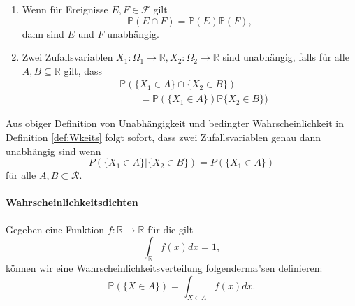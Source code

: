 \begin{Def}

\begin{enumerate}
	\item Wenn f\"ur Ereignisse $E, F \in \mathcal{F} $ gilt
	\begin{equation} 
	\mathbb{P} (E\cap F)= \mathbb{P} (E)  \mathbb{P} (F),
	\end{equation}
        dann sind $E$ und $F$ unabhängig. 
\item Zwei Zufallsvariablen $X_1 : \Omega_1 \to \mathbb{R}, X_2:\Omega_2 \to \mathbb{R}$
sind unabhängig, falls für alle $A, B \subseteq \mathbb{R}$ gilt, dass
\begin{align*}
&\mathbb{P} (\{X_{1} \in A\} \cap \{X_{2} \in B\} )\\ &\qquad= \mathbb{P} (\{X_{1} \in A\})  \mathbb{P} \{X_{2} \in B\} )
\end{align*}
\end{enumerate}

Aus obiger Definition von Unabh\"angigkeit und bedingter Wahrscheinlichkeit in Definition \ref{def:Wkeits} folgt sofort, dass zwei Zufallsvariablen  genau dann unabh\"angig sind wenn
\begin{equation*}
P(\{X_1 \in A\} | \{X_2 \in B\}) = P(\{X_1\in A\})
\end{equation*}
f\"ur alle $A,B \subset \mathcal{R}$. 

\end{Def}




\paragraph{Wahrscheinlichkeitsdichten}

Gegeben eine Funktion $f: \mathbb{R} \rightarrow \mathbb{R}$ f\"ur die gilt 
\begin{equation*}
\int_{\mathbb{R}} f(x) dx = 1,
\end{equation*}
k\"onnen wir eine Wahrscheinlichkeitsverteilung folgenderma"sen definieren:
\begin{equation*}
\mathbb{P} (\{X\in A\}) = \int_{X \in A} f(x) dx. 
\end{equation*}


